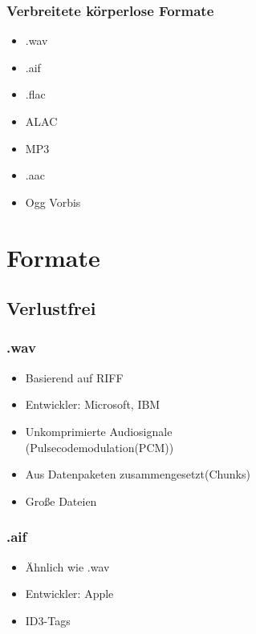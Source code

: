 \documentclass{beamer}
\begin{document}
\begin{frame}
\frametitle{Verbreitete körperlose Formate}
\begin{itemize}
	\centering	
	\Large	
	\item .wav
	\vspace{0.5cm}\item .aif
	\vspace{0.5cm}\item .flac
	\vspace{0.5cm}\item ALAC
	\vspace{0.5cm}\item MP3
	\vspace{0.5cm}\item .aac
	\vspace{0.5cm}\item Ogg Vorbis
\end{itemize}
\end{frame}
\section{Formate}
\subsection{Verlustfrei}

\begin{frame}
\frametitle{.wav}
\begin{itemize}
	\Large	
	\item Basierend auf RIFF
	\vspace{0.5cm}\item Entwickler: Microsoft, IBM	
	\vspace{0.5cm}\item Unkomprimierte Audiosignale\\(Pulsecodemodulation(PCM))
	\vspace{0.5cm}\item Aus Datenpaketen zusammengesetzt(Chunks)
	\vspace{0.5cm}\item Große Dateien
\end{itemize}
\end{frame}

\begin{frame}
\frametitle{.aif}
\begin{itemize}
	\Large
	\item Ähnlich wie .wav
	\vspace{0.5cm}\item Entwickler: Apple
	\vspace{0.5cm}\item ID3-Tags
\end{itemize}

\end{frame}
\end{document}
